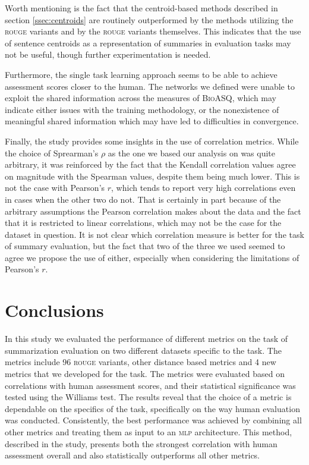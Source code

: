\documentclass[11pt,a4paper]{article}
\newcommand{\rouge}{\textsc{rouge}\xspace}
\newcommand{\mlp}{\textsc{mlp}\xspace}
\newcommand{\bioasq}{\textsc{BioASQ}\xspace}
\begin{document}
Worth mentioning is the fact that the centroid-based methods described in section \ref{ssec:centroids} 
are routinely outperformed by the methods utilizing the \rouge variants and by the \rouge 
variants themselves. This indicates that the use of sentence centroids as a representation 
of summaries in evaluation tasks may not be useful, though further experimentation is needed. 

Furthermore, the single task learning approach seems to be able to achieve assessment 
scores closer to the human. The networks we defined were unable to exploit the shared 
information across the measures of \bioasq, which may indicate either issues with the 
training methodology, or the nonexistence of meaningful shared information which may 
have led to difficulties in convergence.

Finally, the study provides some insights in the use of correlation metrics. While the 
choice of Sprearman’s $\rho$ as the one we based our analysis on was quite arbitrary, 
it was reinforced by the fact that the Kendall correlation values agree on magnitude 
with the Spearman values, despite them being much lower. This is not the case with 
Pearson’s $r$, which tends to report very high correlations even in cases when the other 
two do not. That is certainly in part because of the arbitrary assumptions the Pearson 
correlation makes about the data and the fact that it is restricted to linear correlations, 
which may not be the case for the dataset in question. It is not clear which correlation 
measure is better for the task of summary evaluation, but the fact that two of the three
we used seemed to agree we propose the use of either, especially when considering the 
limitations of Pearson’s $r$.

\section{Conclusions}

\label{sec:conclusions}

In this study we evaluated the performance of different metrics on the task of summarization 
evaluation on two different datasets specific to the task. The metrics include 96 \rouge variants, 
other distance based metrics and 4 new metrics that we developed for the task. The metrics were 
evaluated based on correlations with human assessment scores, and their statistical significance 
was tested using the Williams test. The results reveal that the choice of a metric is dependable 
on the specifics of the task, specifically on the way human evaluation was conducted. Consistently, 
the best performance was achieved by combining all other metrics and treating them as input to an 
\mlp architecture. This method, described in the study, presents both the strongest correlation 
with human assessment overall and also statistically outperforms all other metrics.
\end{document}
